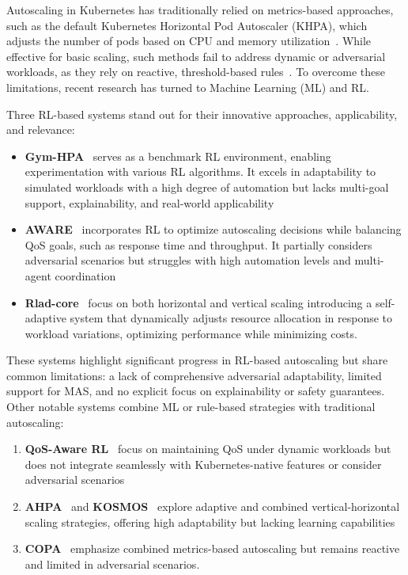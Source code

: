 \noindent Autoscaling in Kubernetes has traditionally relied on metrics-based approaches, such as the default Kubernetes Horizontal Pod Autoscaler (KHPA), which adjusts the number of pods based on CPU and memory utilization~\cite{Carrion2022}. While effective for basic scaling, such methods fail to address dynamic or adversarial workloads, as they rely on reactive, threshold-based rules~\cite{Tran2022}. To overcome these limitations, recent research has turned to Machine Learning (ML) and RL.

Three RL-based systems stand out for their innovative approaches, applicability, and relevance:
%
\begin{itemize}
    \item \textbf{Gym-HPA}~\cite{gymhpa2022} serves as a benchmark RL environment, enabling experimentation with various RL algorithms. It excels in adaptability to simulated workloads with a high degree of automation but lacks multi-goal support, explainability, and real-world applicability
    \item \textbf{AWARE}~\cite{aware2023} incorporates RL to optimize autoscaling decisions while balancing QoS goals, such as response time and throughput. It partially considers adversarial scenarios but struggles with high automation levels and multi-agent coordination
    \item \textbf{Rlad-core}~\cite{Rossi2019} focus on both horizontal and vertical scaling introducing a self-adaptive system that dynamically adjusts resource allocation in response to workload variations, optimizing performance while minimizing costs.
\end{itemize}

These systems highlight significant progress in RL-based autoscaling but share common limitations: a lack of comprehensive adversarial adaptability, limited support for MAS, and no explicit focus on explainability or safety guarantees.
%
Other notable systems combine ML or rule-based strategies with traditional autoscaling:
%
\begin{enumerate}[label={}, itemjoin={;\quad }]
    \item \textbf{QoS-Aware RL}~\cite{QoSRL} focus on maintaining QoS under dynamic workloads but does not integrate seamlessly with Kubernetes-native features or consider adversarial scenarios
    \item \textbf{AHPA}~\cite{Zhou2024} and \textbf{KOSMOS}~\cite{KOSMOS} explore adaptive and combined vertical-horizontal scaling strategies, offering high adaptability but lacking learning capabilities
    \item \textbf{COPA}~\cite{COPA} emphasize combined metrics-based autoscaling but remains reactive and limited in adversarial scenarios.
\end{enumerate}

